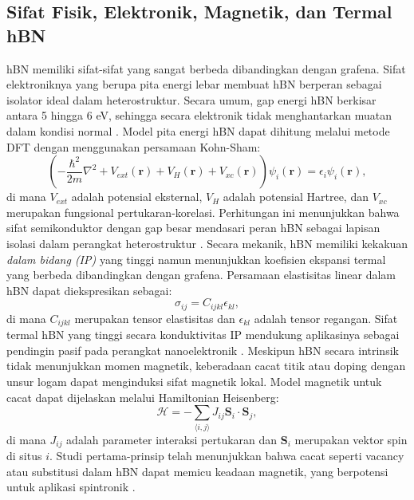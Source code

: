 \subsection{Sifat Fisik, Elektronik, Magnetik, dan Termal hBN}
hBN memiliki sifat-sifat yang sangat berbeda dibandingkan dengan grafena.
Sifat elektroniknya yang berupa pita energi lebar membuat hBN berperan sebagai isolator ideal dalam heterostruktur.
Secara umum, gap energi hBN berkisar antara 5 hingga 6 eV, sehingga secara elektronik tidak menghantarkan muatan dalam kondisi normal \cite{Zhang2020}.
Model pita energi hBN dapat dihitung melalui metode DFT dengan menggunakan persamaan Kohn-Sham:
\begin{equation}
    \left(-\frac{\hbar^2}{2m}\nabla^2 + V_{ext}(\mathbf{r}) + V_H(\mathbf{r}) + V_{xc}(\mathbf{r})\right)\psi_i(\mathbf{r}) = \epsilon_i \psi_i(\mathbf{r}),
\end{equation}
di mana \(V_{ext}\) adalah potensial eksternal, \(V_H\) adalah potensial Hartree, dan \(V_{xc}\) merupakan fungsional pertukaran-korelasi.
Perhitungan ini menunjukkan bahwa sifat semikonduktor dengan gap besar mendasari peran hBN sebagai lapisan isolasi dalam perangkat heterostruktur \cite{Zhang2020}.
Secara mekanik, hBN memiliki kekakuan \emph{dalam bidang (IP)} yang tinggi namun menunjukkan koefisien ekspansi termal yang berbeda dibandingkan dengan grafena.
Persamaan elastisitas linear dalam hBN dapat diekspresikan sebagai:
\begin{equation}
    \sigma_{ij} = C_{ijkl}\epsilon_{kl},
\end{equation}
di mana \(C_{ijkl}\) merupakan tensor elastisitas dan \(\epsilon_{kl}\) adalah tensor regangan.
Sifat termal hBN yang tinggi secara konduktivitas IP mendukung aplikasinya sebagai pendingin pasif pada perangkat nanoelektronik \cite{Zhang2020}.
Meskipun hBN secara intrinsik tidak menunjukkan momen magnetik, keberadaan cacat titik atau doping dengan unsur logam dapat menginduksi sifat magnetik lokal.
Model magnetik untuk cacat dapat dijelaskan melalui Hamiltonian Heisenberg:
\begin{equation}
    \mathcal{H} = -\sum_{\langle i,j \rangle} J_{ij} \mathbf{S}_i \cdot \mathbf{S}_j,
\end{equation}
di mana \(J_{ij}\) adalah parameter interaksi pertukaran dan \(\mathbf{S}_i\) merupakan vektor spin di situs \(i\).
Studi pertama-prinsip telah menunjukkan bahwa cacat seperti vacancy atau substitusi dalam hBN dapat memicu keadaan magnetik, yang berpotensi untuk aplikasi spintronik \cite{Zhang2020}.

